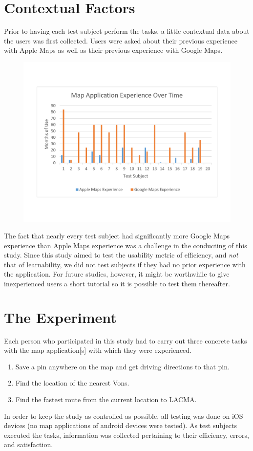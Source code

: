 \documentclass[a4paper; 11pt]{article}
\begin{document}
\section{Contextual Factors}
Prior to having each test subject perform the tasks, a little contextual data about the users was first collected. Users were asked about their previous experience with Apple Maps as well as their previous experience with Google Maps.
\vspace{-.2in}
\begin{figure}[ht]
\begin{center}
\includegraphics[keepaspectratio, width=.7\textwidth ]{user_context.pdf}
\end{center}
\end{figure}
\clearpage
\par
The fact that nearly every test subject had significantly more Google Maps experience than Apple Maps experience was a challenge in the conducting of this study.  Since this study aimed to test the usability metric of efficiency, and \textit{not} that of learnability, we did not test subjects if they had no prior experience with the application. For future studies, however, it might be worthwhile to give inexperienced users a short tutorial so it is possible to test them thereafter.



\section{The Experiment} \label{sec:Experiment}
Each person who participated in this study had to carry out three concrete tasks with the map application[s] with which they were experienced.
\begin{enumerate}
  \item Save a pin anywhere on the map and get driving directions to that pin.
  \item Find the location of the nearest Vons.
  \item Find the fastest route from the current location to LACMA.
\end{enumerate}
In order to keep the study as controlled as possible, all testing was done on iOS devices (no map applications of android devices were tested). As test subjects executed the tasks, information was collected pertaining to their efficiency, errors, and satisfaction.
\end{document}
